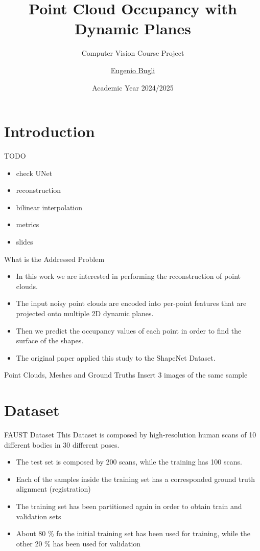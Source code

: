 \documentclass{beamer}
\title{Point Cloud Occupancy with Dynamic Planes}
\subtitle{Computer Vision Course Project}
\author{\href{mailto:bugli.1934824@studenti.uniroma1.it}{Eugenio Bugli}}
\date{Academic Year 2024/2025}
\begin{document}
\maketitle

\section{Introduction}

\begin{frame}{TODO}
\begin{itemize}
\item check UNet
\item reconstruction
\item bilinear interpolation
\item metrics
\item slides
\end{itemize}
\end{frame}

\begin{frame}{What is the Addressed Problem}
\begin{itemize}
	\item In this work we are interested in performing the reconstruction of point clouds. 
	\item The input noisy point clouds are encoded into per-point features that are projected onto multiple 2D dynamic planes.
	\item Then we predict the occupancy values of each point in order to find the surface of the shapes.
	\item The original paper applied this study to the ShapeNet Dataset.
\end{itemize}
\end{frame} 

\begin{frame}{Point Clouds, Meshes and Ground Truths}
Insert 3 images of the same sample
\end{frame}

\section{Dataset}

\begin{frame}{FAUST Dataset}
    This Dataset is composed by high-resolution human scans of 10 different bodies in 30 different poses. 
    \begin{itemize}
    \item The test set is composed by 200 scans, while the training has 100 scans.
    \item Each of the samples inside the training set has a corresponded ground truth alignment (registration)
    \item The training set has been partitioned again in order to obtain train and validation sets
    \item About 80 \% fo the initial training set has been used for training, while the other 20 \% has been used for validation 
    \end{itemize}
\end{frame}
\end{document}
